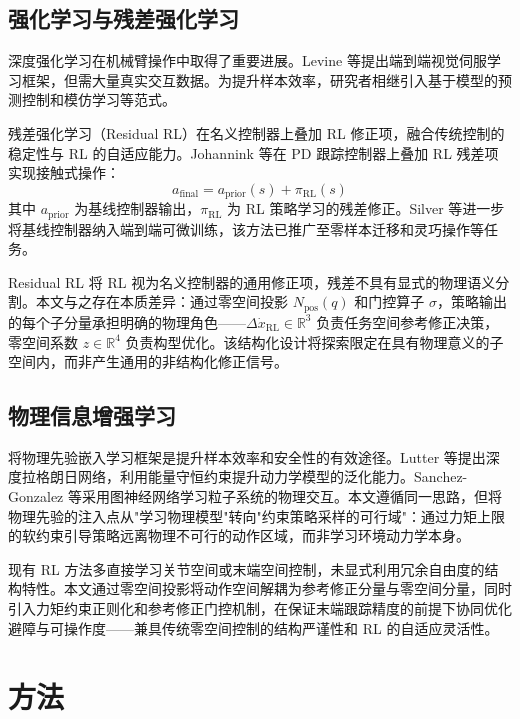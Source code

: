 \documentclass[10pt,conference]{IEEEtran}
\begin{document}
\subsection{强化学习与残差强化学习}
深度强化学习在机械臂操作中取得了重要进展。Levine 等\cite{levine2016end}提出端到端视觉伺服学习框架，但需大量真实交互数据。为提升样本效率，研究者相继引入基于模型的预测控制\cite{nagabandi2018neural}和模仿学习\cite{rajeswaran2017learning}等范式。

残差强化学习（Residual RL）在名义控制器上叠加 RL 修正项，融合传统控制的稳定性与 RL 的自适应能力。Johannink 等\cite{johannink2019residual}在 PD 跟踪控制器上叠加 RL 残差项实现接触式操作：
\begin{equation}
a_{\text{final}} = a_{\text{prior}}(s) + \pi_{\text{RL}}(s)
\end{equation}
其中 $a_{\text{prior}}$ 为基线控制器输出，$\pi_{\text{RL}}$ 为 RL 策略学习的残差修正。Silver 等\cite{silver2018residual}进一步将基线控制器纳入端到端可微训练，该方法已推广至零样本迁移\cite{cheng2019zero}和灵巧操作\cite{xie2020residual}等任务。

Residual RL 将 RL 视为名义控制器的通用修正项，残差不具有显式的物理语义分割。本文与之存在本质差异：通过零空间投影 $N_{\text{pos}}(q)$ 和门控算子 $\sigma$，策略输出的每个子分量承担明确的物理角色——$\Delta\dot{x}_{\text{RL}} \in \mathbb{R}^3$ 负责任务空间参考修正决策，零空间系数 $z \in \mathbb{R}^4$ 负责构型优化。该结构化设计将探索限定在具有物理意义的子空间内，而非产生通用的非结构化修正信号。

\subsection{物理信息增强学习}
将物理先验嵌入学习框架是提升样本效率和安全性的有效途径。Lutter 等\cite{lutter2019deep}提出深度拉格朗日网络，利用能量守恒约束提升动力学模型的泛化能力。Sanchez-Gonzalez 等\cite{sanchez2020learning}采用图神经网络学习粒子系统的物理交互。本文遵循同一思路，但将物理先验的注入点从"学习物理模型"转向"约束策略采样的可行域"：通过力矩上限的软约束引导策略远离物理不可行的动作区域，而非学习环境动力学本身。

现有 RL 方法多直接学习关节空间或末端空间控制，未显式利用冗余自由度的结构特性。本文通过零空间投影将动作空间解耦为参考修正分量与零空间分量，同时引入力矩约束正则化和参考修正门控机制，在保证末端跟踪精度的前提下协同优化避障与可操作度——兼具传统零空间控制的结构严谨性和 RL 的自适应灵活性。

\section{方法}
\end{document}
